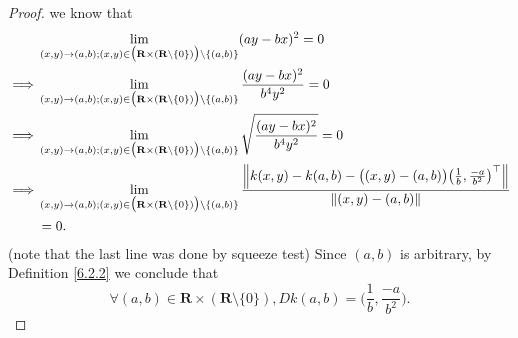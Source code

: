 \begin{proof}
    we know that
    \begin{align*}
                 & \lim_{(x, y) \to (a, b) ; (x, y) \in \big(\mathbf{R} \times (\mathbf{R} \setminus \{0\})\big) \setminus \{(a, b)\}} (ay - bx)^2 = 0                                                                                                                  \\
        \implies & \lim_{(x, y) \to (a, b) ; (x, y) \in \big(\mathbf{R} \times (\mathbf{R} \setminus \{0\})\big) \setminus \{(a, b)\}} \frac{(ay - bx)^2}{b^4 y^2} = 0                                                                                                  \\
        \implies & \lim_{(x, y) \to (a, b) ; (x, y) \in \big(\mathbf{R} \times (\mathbf{R} \setminus \{0\})\big) \setminus \{(a, b)\}} \sqrt{\frac{(ay - bx)^2}{b^4 y^2}} = 0                                                                                           \\
        \implies & \lim_{(x, y) \to (a, b) ; (x, y) \in \big(\mathbf{R} \times (\mathbf{R} \setminus \{0\})\big) \setminus \{(a, b)\}} \frac{\norm*{k(x, y) - k(a, b) - \big((x, y) - (a, b)\big) \big(\frac{1}{b}, \frac{-a}{b^2}\big)^\top}}{\norm*{(x, y) - (a, b)}} \\
                 & = 0.
    \end{align*}
    (note that the last line was done by squeeze test)
    Since \((a, b)\) is arbitrary, by Definition \ref{6.2.2} we conclude that
    \[
        \forall (a, b) \in \mathbf{R} \times (\mathbf{R} \setminus \{0\}), D k(a, b) = \bigg(\frac{1}{b}, \frac{-a}{b^2}\bigg).
    \]


\end{proof}

